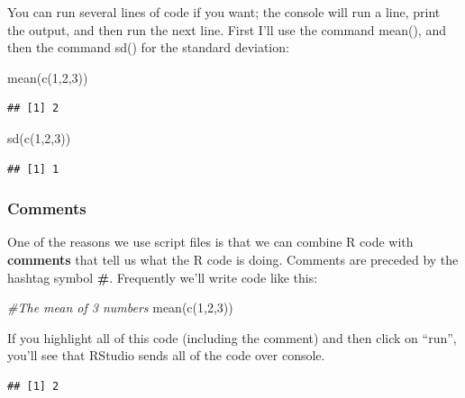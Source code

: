 \documentclass[
]{book}
\newenvironment{Shaded}{\begin{snugshade}}{\end{snugshade}}
\newcommand{\CommentTok}[1]{\textcolor[rgb]{0.56,0.35,0.01}{\textit{#1}}}
\newcommand{\DecValTok}[1]{\textcolor[rgb]{0.00,0.00,0.81}{#1}}
\newcommand{\FunctionTok}[1]{\textcolor[rgb]{0.00,0.00,0.00}{#1}}
\newcommand{\NormalTok}[1]{#1}
\begin{document}
You can run several lines of code if you want; the console will run a line, print the output, and then run the next line. First I'll use the command mean(), and then the command sd() for the standard deviation:

\begin{Shaded}
\begin{Highlighting}[]
\FunctionTok{mean}\NormalTok{(}\FunctionTok{c}\NormalTok{(}\DecValTok{1}\NormalTok{,}\DecValTok{2}\NormalTok{,}\DecValTok{3}\NormalTok{))}
\end{Highlighting}
\end{Shaded}

\begin{verbatim}
## [1] 2
\end{verbatim}

\begin{Shaded}
\begin{Highlighting}[]
\FunctionTok{sd}\NormalTok{(}\FunctionTok{c}\NormalTok{(}\DecValTok{1}\NormalTok{,}\DecValTok{2}\NormalTok{,}\DecValTok{3}\NormalTok{))}
\end{Highlighting}
\end{Shaded}

\begin{verbatim}
## [1] 1
\end{verbatim}

\hypertarget{comments}{%
\subsubsection{Comments}\label{comments}}

One of the reasons we use script files is that we can combine R code with \textbf{comments} that tell us what the R code is doing. Comments are preceded by the hashtag symbol \textbf{\#}. Frequently we'll write code like this:

\begin{Shaded}
\begin{Highlighting}[]
\CommentTok{\#The mean of 3 numbers}
\FunctionTok{mean}\NormalTok{(}\FunctionTok{c}\NormalTok{(}\DecValTok{1}\NormalTok{,}\DecValTok{2}\NormalTok{,}\DecValTok{3}\NormalTok{))}
\end{Highlighting}
\end{Shaded}

If you highlight all of this code (including the comment) and then click on ``run'', you'll see that RStudio sends all of the code over console.

\begin{verbatim}
## [1] 2
\end{verbatim}
\end{document}

